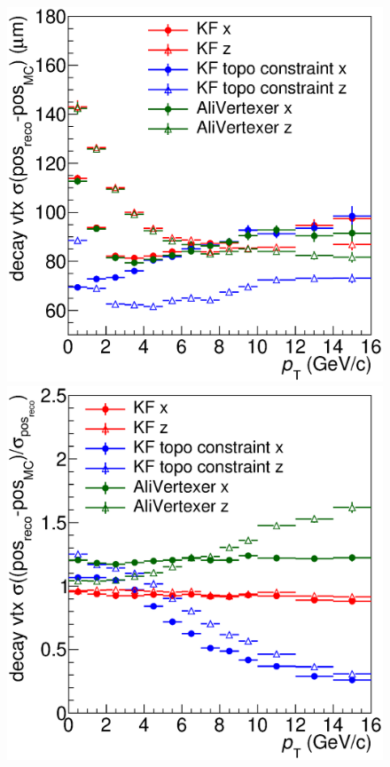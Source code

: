 \documentclass[b5paper,10pt,twoside,oldstyle,classica]{toptesi}
\begin{document}
\begin{figure}[tb]
\begin{center}
{\includegraphics[scale = 0.28]{ResSVXZ.eps}}
\hspace{0.cm}
{\includegraphics[scale = 0.28]{PullsSVXZ.eps}}

\end{center}
\end{figure}
\end{document}
